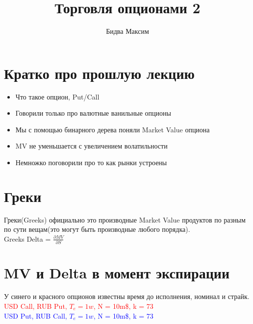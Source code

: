 \documentclass{article}
\title{Торговля опционами 2}
\author{Бидва Максим}
\begin{document}
\maketitle
\tableofcontents
\newpage
\section{Кратко про прошлую лекцию}
\begin{multicols}
    \begin{itemize}
        \item Что такое опцион, Put/Call
        \item Говорили только про валютные ванильные опционы
        \item Мы с помощью бинарного дерева поняли Market Value опциона
        \item MV не уменьшается с увеличением волатильности
        \item Немножко поговорили про то как рынки устроены
    \end{itemize}
\end{multicols}

\section{Греки}

Греки(Greeks) официально это производные Market Value продуктов по разным по сути вещам(это могут быть производные любого порядка).\\
Greeks Delta = $\frac{\partial MV}{\partial S}$
\section{MV и Delta в момент экспирации}
У синего и красного опционов известны время до исполнения, номинал и страйк.\\
\textcolor{red}{USD Call, RUB Put, $T_e = 1w$, N = 10m\$, k = 73}\\
\textcolor{blue}{USD Put, RUB Call, $T_e = 1w$, N = 10m\$, k = 73}
\end{document}
